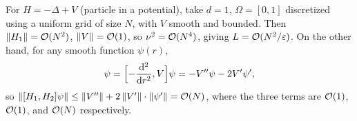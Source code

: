 \begin{example}
For $H = -\Delta + V$ (particle in a potential), take $d = 1$, $\Omega = [0,1]$
discretized using a uniform grid of size $N$, with $V$ smooth and bounded. Then
$\left\lVert H_1 \right\rVert = \mathcal{O}(N^2)$, $\left\lVert V \right\rVert = \mathcal{O}(1)$, so $\nu^2 = \mathcal{O}(N^4)$, giving
$L = \mathcal{O}(N^2/\varepsilon)$. On the other hand, for any smooth function
$\psi(r)$,
\begin{equation}
  [H_1, H_2]\psi = \Bigl[-\frac{\dd^2}{\dd r^2}, V\Bigr]\psi = -V''\psi - 2V'\psi',
\end{equation}
so $\left\lVert [H_1, H_2]\psi \right\rVert \le \left\lVert V'' \right\rVert + 2\left\lVert V' \right\rVert\cdot\left\lVert \psi' \right\rVert = \mathcal{O}(N)$,
where the three terms are $\mathcal{O}(1)$, $\mathcal{O}(1)$, and $\mathcal{O}(N)$ respectively.
\end{example}
